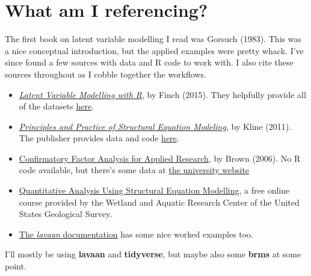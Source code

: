 \documentclass[
  letterpaper,
  DIV=11,
  numbers=noendperiod]{scrreprt}
\begin{document}
\hypertarget{what-am-i-referencing}{%
\section*{What am I referencing?}\label{what-am-i-referencing}}


The first book on latent variable modelling I read was Gorsuch (1983).
This was a nice conceptual introduction, but the applied examples were
pretty whack. I've since found a few sources with data and R code to
work with. I also cite these sources throughout as I cobble together the
workflows.

\begin{itemize}
\item
  \href{https://www.routledge.com/Latent-Variable-Modeling-with-R/Finch-French/p/book/9780415832458}{\emph{Latent
  Variable Modelling with R}}, by Finch (2015). They helpfully provide
  all of the datasets
  \href{https://www.routledge.com/Latent-Variable-Modeling-with-R/Finch-French/p/book/9780415832458}{here}.
\item
  \href{https://www.guilford.com/books/Principles-and-Practice-of-Structural-Equation-Modeling/Rex-Kline/9781462523344}{\emph{Principles
  and Practice of Structural Equation Modeling}}, by Kline (2011). The
  publisher provides data and code
  \href{https://www.guilford.com/companion-site/Principles-and-Practice-of-Structural-Equation-Modeling-Fourth-Edition/9781462523344}{here}.
\item
  \href{http://www.kharazmi-statistics.ir/Uploads/Public/book/Methodology\%20in\%20the\%20Social\%20Sciences.pdf}{Confirmatory
  Factor Analysis for Applied Research}, by Brown (2006). No R code
  available, but there's some data at
  \href{https://people.bu.edu/tabrown/cfabook.html}{the university
  website}
\item
  \href{https://www.usgs.gov/centers/wetland-and-aquatic-research-center/science/quantitative-analysis-using-structural-equation}{Quantitative
  Analysis Using Structural Equation Modelling}, a free online course
  provided by the Wetland and Aquatic Research Center of the United
  States Geological Survey.
\item
  \href{https://www.lavaan.ugent.be/tutorial/index.html}{The
  \emph{lavaan} documentation} has some nice worked examples too.
\end{itemize}

I'll mostly be using \textbf{lavaan} and \textbf{tidyverse}, but maybe
also some \textbf{brms} at some point.
\end{document}
